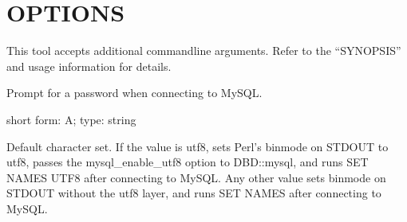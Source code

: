 \documentclass[letterpaper,10pt,english]{sphinxmanual}
\begin{document}
\section{OPTIONS}
\label{\detokenize{mariadb-config-diff:options}}
This tool accepts additional command\sphinxhyphen{}line arguments.  Refer to the
“SYNOPSIS” and usage information for details.

\begin{fulllineitems}
\label{\detokenize{mariadb-config-diff:cmdoption-mariadb-config-diff-ask-pass}}
Prompt for a password when connecting to MySQL.

\end{fulllineitems}


\begin{fulllineitems}
\label{\detokenize{mariadb-config-diff:cmdoption-mariadb-config-diff-charset}}
short form: \sphinxhyphen{}A; type: string

Default character set.  If the value is utf8, sets Perl’s binmode on
STDOUT to utf8, passes the mysql\_enable\_utf8 option to DBD::mysql, and
runs SET NAMES UTF8 after connecting to MySQL.  Any other value sets
binmode on STDOUT without the utf8 layer, and runs SET NAMES after
connecting to MySQL.

\end{fulllineitems}
\end{document}
